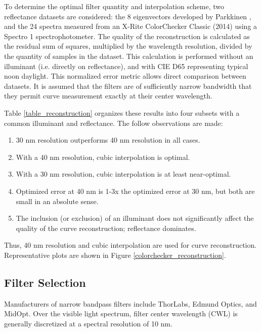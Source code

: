 \documentclass[twocolumn,10pt]{asme2ej}
\begin{document}
To determine the optimal filter quantity and interpolation scheme, two reflectance datasets are considered: the 8 eigenvectors developed by Parkkinen \cite{Parkkinen}, and the 24 spectra measured from an X-Rite ColorChecker Classic (2014) using a Spectro 1 spectrophotometer. The quality of the reconstruction is calculated as the residual sum of squares, multiplied by the wavelength resolution, divided by the quantity of samples in the dataset. This calculation is performed without an illuminant (i.e. directly on reflectance), and with CIE D65 representing typical noon daylight. This normalized error metric allows direct comparison between datasets. It is assumed that the filters are of sufficiently narrow bandwidth that they permit curve measurement exactly at their center wavelength.

Table \ref{table_reconstruction} organizes these results into four subsets with a common illuminant and reflectance. The follow observations are made:

\begin{enumerate}
  \item 30 nm resolution outperforms 40 nm resolution in all cases.
  \item With a 40 nm resolution, cubic interpolation is optimal.
  \item With a 30 nm resolution, cubic interpolation is at least near-optimal.
  \item Optimized error at 40 nm is 1-3x the optimized error at 30 nm, but both are small in an absolute sense.
  \item The inclusion (or exclusion) of an illuminant does not significantly affect the quality of the curve reconstruction; reflectance dominates.
\end{enumerate}

Thus, 40 nm resolution and cubic interpolation are used for curve reconstruction. Representative plots are shown in Figure \ref{colorchecker_reconstruction}.

\subsection{Filter Selection}

\label{section_filters}

\noindent Manufacturers of narrow bandpass filters include ThorLabs, Edmund Optics, and MidOpt. Over the visible light spectrum, filter center wavelength (CWL) is generally discretized at a spectral resolution of 10 nm.
\end{document}
